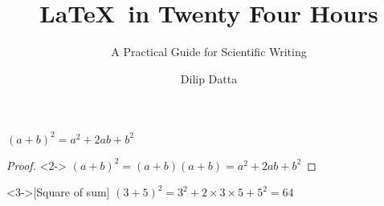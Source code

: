 \documentclass{beamer}
\title[\LaTeX\ in 24H]{\LaTeX\ in Twenty Four Hours}
\subtitle{A Practical Guide for Scientific Writing}
\author[D. Datta]{Dilip Datta}
\begin{document}
 
    \begin{frame}[t]
        \begin{theorem}
        $(a+b)^2 = a^2 + 2ab + b^2$
        \end{theorem}
        \begin{proof}<2->
        $(a+b)^2=(a+b)(a+b)=a^2+2ab+b^2$
        \end{proof}
        \begin{example}<3->[Square of sum]
        $(3+5)^2=3^2+2\times3\times5+5^2=64$
        \end{example}
    \end{frame}
\end{document}
